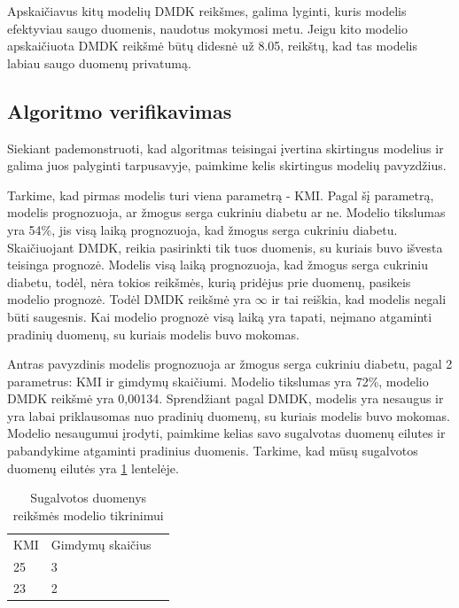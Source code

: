 \documentclass{VUMIFInfBakalaurinis}
\begin{document}
\par Apskaičiavus kitų modelių DMDK reikšmes, galima lyginti, kuris modelis efektyviau saugo duomenis, naudotus mokymosi metu. Jeigu kito modelio apskaičiuota DMDK reikšmė būtų didesnė už 8.05, reikštų, kad tas modelis labiau saugo duomenų privatumą.

\subsection{Algoritmo verifikavimas}
\par Siekiant pademonstruoti, kad algoritmas teisingai įvertina skirtingus modelius ir galima juos palyginti tarpusavyje, paimkime kelis skirtingus modelių pavyzdžius.
\par Tarkime, kad pirmas modelis turi viena parametrą - KMI. Pagal šį parametrą, modelis prognozuoja, ar žmogus serga cukriniu diabetu ar ne. Modelio tikslumas yra 54\%, jis visą laiką prognozuoja, kad žmogus serga cukriniu diabetu. Skaičiuojant DMDK, reikia pasirinkti tik tuos duomenis, su kuriais buvo išvesta teisinga prognozė. Modelis visą laiką prognozuoja, kad žmogus serga cukriniu diabetu, todėl, nėra tokios reikšmės, kurią pridėjus prie duomenų, pasikeis modelio prognozė. Todėl DMDK reikšmė yra $\infty$ ir tai reiškia, kad modelis negali būti saugesnis. Kai modelio prognozė visą laiką yra tapati, neįmano atgaminti pradinių duomenų, su kuriais modelis buvo mokomas.
\par Antras pavyzdinis modelis prognozuoja ar žmogus serga cukriniu diabetu, pagal 2 parametrus: KMI ir gimdymų skaičiumi. Modelio tikslumas yra 72\%, modelio DMDK reikšmė yra 0,00134. Sprendžiant pagal DMDK, modelis yra nesaugus ir yra labai priklausomas nuo pradinių duomenų, su kuriais modelis buvo mokomas. Modelio nesaugumui įrodyti, paimkime kelias savo sugalvotas duomenų eilutes ir pabandykime atgaminti pradinius duomenis. Tarkime, kad mūsų sugalvotos duomenų eilutės yra \ref{tab:KMI ir gimdymų skaičius} lentelėje.

\begin{table}[h]
\centering
\begin{tabular}{|l|l|l|}
\cline{1-2}
KMI & Gimdymų skaičius \\\cline{1-2}
25      & 3 \\\cline{1-2}
23       & 2 \\\cline{1-2}
\end{tabular}
\caption{Sugalvotos duomenys reikšmės modelio tikrinimui}
\label{tab:KMI ir gimdymų skaičius}
\end{table}
\end{document}
